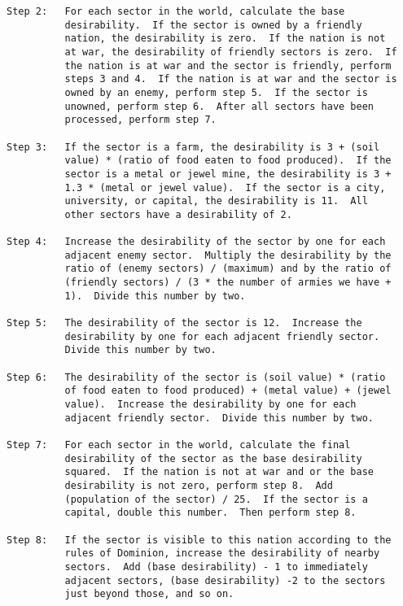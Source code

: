 \begin{verbatim}
Step 2:   For each sector in the world, calculate the base
          desirability.  If the sector is owned by a friendly
          nation, the desirability is zero.  If the nation is not
          at war, the desirability of friendly sectors is zero.  If
          the nation is at war and the sector is friendly, perform
          steps 3 and 4.  If the nation is at war and the sector is
          owned by an enemy, perform step 5.  If the sector is
          unowned, perform step 6.  After all sectors have been
          processed, perform step 7.

Step 3:   If the sector is a farm, the desirability is 3 + (soil
          value) * (ratio of food eaten to food produced).  If the
          sector is a metal or jewel mine, the desirability is 3 +
          1.3 * (metal or jewel value).  If the sector is a city,
          university, or capital, the desirability is 11.  All
          other sectors have a desirability of 2.

Step 4:   Increase the desirability of the sector by one for each
          adjacent enemy sector.  Multiply the desirability by the
          ratio of (enemy sectors) / (maximum) and by the ratio of
          (friendly sectors) / (3 * the number of armies we have +
          1).  Divide this number by two.

Step 5:   The desirability of the sector is 12.  Increase the
          desirability by one for each adjacent friendly sector. 
          Divide this number by two.

Step 6:   The desirability of the sector is (soil value) * (ratio
          of food eaten to food produced) + (metal value) + (jewel
          value).  Increase the desirability by one for each
          adjacent friendly sector.  Divide this number by two.

Step 7:   For each sector in the world, calculate the final
          desirability of the sector as the base desirability
          squared.  If the nation is not at war and or the base
          desirability is not zero, perform step 8.  Add
          (population of the sector) / 25.  If the sector is a
          capital, double this number.  Then perform step 8.

Step 8:   If the sector is visible to this nation according to the
          rules of Dominion, increase the desirability of nearby
          sectors.  Add (base desirability) - 1 to immediately
          adjacent sectors, (base desirability) -2 to the sectors
          just beyond those, and so on.


\end{verbatim}
